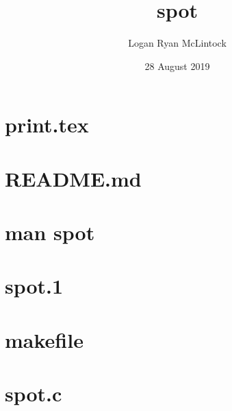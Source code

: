 \documentclass[titlepage, a4paper]{article}
\title{spot}
\date {28 August 2019}
\author{Logan Ryan McLintock}
\begin{document}
\maketitle

\tableofcontents
\newpage

\section{print.tex}
\newpage

\section{README.md}
\newpage

\section{man spot}


\section{spot.1}
\newpage

\section{makefile}
\newpage

\section{spot.c}
\end{document}
